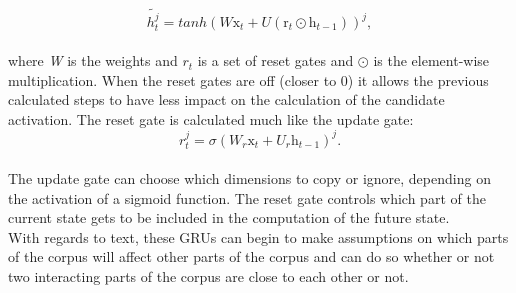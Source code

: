\begin{equation} \label{eq:candidate}
\tilde{h_{t}^{j}} = tanh\left(W\mathrm{x}_{t}+U\left(\mathrm{r}_{t}\odot\mathrm{h}_{t-1}\right)\right)^{j},
\end{equation}\\

where \textit{W} is the weights and $r_{t}$ is a set of reset gates and $\odot$ is the element-wise multiplication. When the reset gates are off (closer to 0) it allows the previous calculated steps to have less impact on the calculation of the candidate activation. The reset gate is calculated much like the update gate:\\

\begin{equation}\label{eq:reset}
r_{t}^{j}=\sigma\left(W_{r}\mathrm{x}_{t}+U_{r}\mathrm{h}_{t-1}\right)^{j}.
\end{equation}\\

The update gate can choose which dimensions to copy or ignore, depending on the activation of a sigmoid function. The reset gate controls which part of the current state gets to be included in the computation of the future state.\\
With regards to text, these GRUs can begin to make assumptions on which parts of the corpus will affect other parts of the corpus and can do so whether or not two interacting parts of the corpus are close to each other or not.

